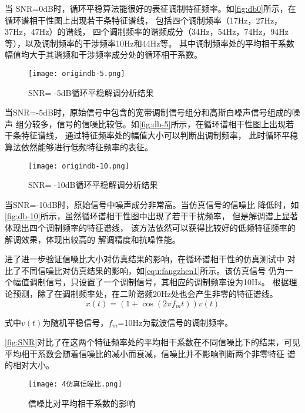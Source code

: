 当 SNR=0dB时，循环平稳算法能很好的表征调制特征频率。如\autoref{fig:db0}所示，在循环谱相干性图上出现若干条特征谱线，
包括四个调制频率（17Hz，27Hz，37Hz，47Hz）的谱线，
四个调制频率的谐频成分（34Hz，54Hz，74Hz，94Hz等），以及调制频率的干涉频率10Hz和44Hz等。
其中调制频率处的平均相干系数幅值均大于其谐频和干涉频率成分处的循环相干系数。
\begin{figure}[htbp]
    \centering
    \texttt{[image: origindb-5.png]}
    \caption{\label{fig:db-5}SNR= -5dB循环平稳解调分析结果}
\end{figure}

当SNR=-5dB时，原始信号中包含的宽带调制信号组分和高斯白噪声信号组成的噪声
组分较多，信号的信噪比较低。如\autoref{fig:db-5}所示，在循环谱相干性图上出现若干条特征谱线，
通过特征频率处的幅值大小可以判断出调制频率，
此时循环平稳算法依然能够进行低频特征频率的表征。

\begin{figure}[htbp]
    \centering
    \texttt{[image: origindb-10.png]}
    \caption{\label{fig:db-10}SNR= -10dB循环平稳解调分析结果}
\end{figure}

当SNR=-10dB时，原始信号中噪声成分非常高。当仿真信号的信噪比
降低时，如\autoref{fig:db-10}所示，虽然循环谱相干性图中出现了若干干扰频率，
但是解调谱上显著体现出四个调制频率的特征谱线，
该方法依然可以获得比较好的低频特征频率的解调效果，体现出较高的
解调精度和抗噪性能。

进了进一步验证信嗓比大小对仿真结果的影响，在循环谱相干性的仿真测试中
对比了不同信噪比对仿真结果的影响，如\autoref{equ:fangzhen1}所示。该仿真信号
仍为一个幅值调制信号，只设置了一个调制信号，其相应的调制频率设为10Hz。
根据理论预测，除了在调制频率处，在二阶谐频20Hz处也会产生非零的特征谱线。
\begin{equation}
    \label{equ:fangzhen1}
    x\left ( t \right ) =\left ( 1+\cos \left ( 2\pi f_mt \right )  \right ) v\left ( t \right ) 
\end{equation}

式中$v\left ( t \right )$为随机平稳信号，$f_m$=10Hz为载波信号的调制频率。

\autoref{fig:SNR}对比了在这两个特征频率处的平均相干系数在不同信噪比下的结果，可见
平均相干系数会随着信噪比的减小而衰减，信噪比并不影响判断两个非零特征
谱的相对大小。

\begin{figure}[htbp]
    \centering
    \texttt{[image: 4仿真信噪比.png]}
    \caption{\label{fig:SNR}信噪比对平均相干系数的影响
    }
\end{figure}

